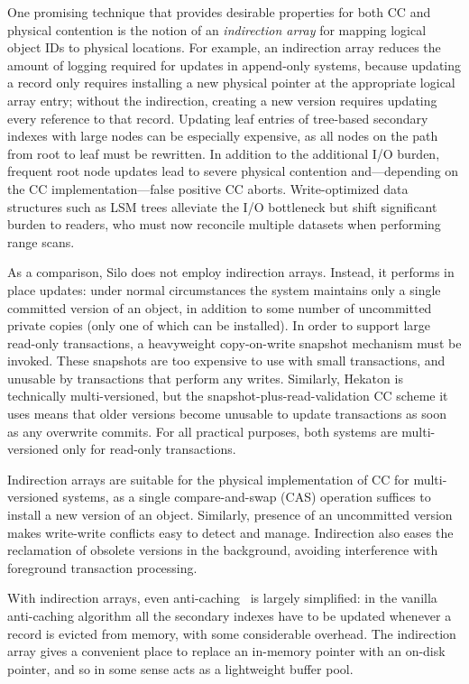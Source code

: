 One promising technique that provides desirable properties for both CC and physical contention is the notion of an {\em indirection array} \cite{SadoghiRCB13,Diaconu+13} for mapping logical object IDs to physical locations.
For example, an indirection array reduces the amount of logging required for updates in append-only systems, because updating a record only requires installing a new physical pointer at the appropriate logical array entry; without the indirection, creating a new version requires updating every reference to that record. Updating leaf entries of tree-based secondary indexes with large nodes can be especially expensive, as all nodes on the path from root to leaf must be rewritten. In addition to the additional I/O burden, frequent root node updates lead to severe physical contention and---depending on the CC implementation---false positive CC aborts. Write-optimized data structures such as LSM trees \cite{NeilCGO96,SearsR12} alleviate the I/O bottleneck but shift significant burden to readers, who must now reconcile multiple datasets when performing range scans. 

As a comparison, Silo does not employ indirection arrays. Instead, it performs in place updates: under normal circumstances the system maintains only a single committed version of an object, in addition to some number of uncommitted private copies (only one of which can be installed). In order to support large read-only transactions, a heavyweight copy-on-write snapshot mechanism must be invoked. These snapshots are too expensive to use with small transactions, and unusable by transactions that perform any writes. Similarly, Hekaton is technically multi-versioned, but the snapshot-plus-read-validation CC scheme it uses means that older versions become unusable to update transactions as soon as any overwrite commits. For all practical purposes, both systems are multi-versioned only for read-only transactions.

Indirection arrays are suitable for the physical implementation of CC for multi-versioned systems, as a single compare-and-swap (CAS) operation suffices to install a new version of an object. Similarly, presence of an uncommitted version makes write-write conflicts easy to detect and manage. Indirection also eases the reclamation of obsolete versions in the background, avoiding interference with foreground transaction processing.

With indirection arrays, even anti-caching~\cite{DeBrabantPTSZ13} is largely simplified: in the vanilla anti-caching algorithm all the secondary indexes have to be updated whenever a record is evicted from memory, with some considerable overhead. The indirection array gives a convenient place to replace an in-memory pointer with an on-disk pointer, and so in some sense acts as a lightweight buffer pool. 

